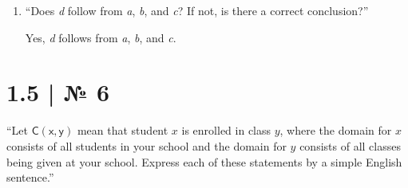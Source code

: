 \documentclass[
   paper=a4,
   fontsize=11pt,
   parskip=no,       %
   fleqn             %
]{scrartcl}
\newcommand{\Pm}[1]{\ensuremath{\mathsf{#1}}}
\newcommand{\Pv}[1]{\ensuremath{\mathit{#1}}}
\begin{document}
\begin{enumerate}[
      leftmargin=0pt, labelsep=0.25em,
      label=\textsf{\textbf{\alph*)}}
]

   \item “Does \textit{d} follow from \textit{a}, \textit{b}, and \textit{c}? If not, is there a
   correct conclusion?”

   Yes, \textit{d} follows from \textit{a}, \textit{b}, and \textit{c}.

\end{enumerate}

\section*{1.5 | № 6}
\begin{addmargin}[2.5em]{2.5em}{\sffamily
   “Let \Pm{C(x, y)} mean that student \Pv{x} is enrolled in class \Pv{y}, where the domain for
   \Pv{x} consists of all students in your school and the domain for \Pv{y} consists of all classes
   being given at your school. Express each of these statements by a simple English sentence.”
}\end{addmargin}
\end{document}
